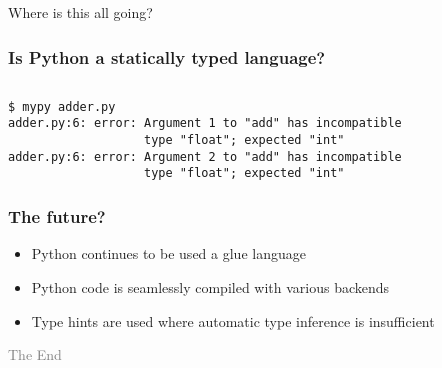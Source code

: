 \documentclass[serif]{beamer}
\begin{document}
\begin{frame}[c]
  \Huge{Where is this all going?}
\end{frame}

\begin{frame}[fragile]
  \frametitle{Is Python a statically typed language?}

  \pause

  \inputminted{python3}{adder.py}

  \pause
  \begin{verbatim}
$ mypy adder.py
adder.py:6: error: Argument 1 to "add" has incompatible
                   type "float"; expected "int"
adder.py:6: error: Argument 2 to "add" has incompatible
                   type "float"; expected "int"
  \end{verbatim}
\end{frame}

\begin{frame}
  \frametitle{The future?}

  \begin{itemize}
  \item Python continues to be used a glue language
  \item Python code is seamlessly compiled with various backends
  \item Type hints are used where automatic type inference is insufficient
  \end{itemize}
\end{frame}

\begin{frame}[fragile]
  \textcolor{gray}{The End}

  \bigskip

\end{frame}
\end{document}
